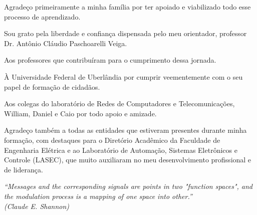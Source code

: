 \documentclass[
  12pt,				%
  openright,			%
  twoside,			%
  a4paper,			%
  english,			%
  french,				%
  spanish,			%
  brazil,				%
  ]{abntex2}
\begin{document}



\begin{agradecimentos}
  Agradeço primeiramente a minha família por ter apoiado e viabilizado todo esse processo de
  aprendizado.

  Sou grato pela liberdade e confiança dispensada pelo meu orientador, professor Dr. Antônio
  Cláudio Paschoarelli Veiga.

  Aos professores que contribuíram para o cumprimento dessa jornada.

  À Universidade Federal de Uberlândia por cumprir veementemente com o seu papel de formação de
  cidadãos.

  Aos colegas do laboratório de Redes de Computadores e Telecomunicações, William, Daniel e Caio
  por todo apoio e amizade.

  Agradeço também a todas as entidades que estiveram presentes durante minha formação, com destaques
  para o Diretório Acadêmico da Faculdade de Engenharia Elétrica e ao Laboratório de Automação,
  Sistemas Eletrônicos e Controle (LASEC), que muito auxiliaram no meu desenvolvimento profissional
  e de liderança.

\end{agradecimentos}

\begin{epigrafe}
  \vspace*{\fill}
  \begin{flushright}
    \textit{``Messages and the corresponding signals are points in two "function spaces", and the
      modulation process is a mapping of one space into other.''\\ (Claude E. Shannon)}
  \end{flushright}
\end{epigrafe}

\end{document}
